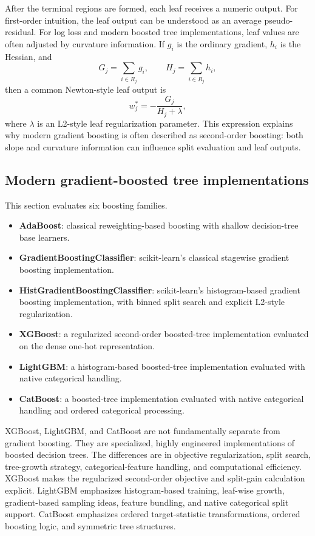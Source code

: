 After the terminal regions are formed, each leaf receives a numeric output. For first-order intuition, the leaf output can be understood as an average pseudo-residual. For log loss and modern boosted tree implementations, leaf values are often adjusted by curvature information. If \(g_i\) is the ordinary gradient, \(h_i\) is the Hessian, and
\[
G_j=\sum_{i\in R_j}g_i,
\qquad
H_j=\sum_{i\in R_j}h_i,
\]
then a common Newton-style leaf output is
\[
w_j^*
=
-
\frac{G_j}{H_j+\lambda},
\]
where \(\lambda\) is an L2-style leaf regularization parameter. This expression explains why modern gradient boosting is often described as second-order boosting: both slope and curvature information can influence split evaluation and leaf outputs.

\subsection{Modern gradient-boosted tree implementations}

This section evaluates six boosting families.

\begin{itemize}[leftmargin=*]
    \item \textbf{AdaBoost}: classical reweighting-based boosting with shallow decision-tree base learners.
    \item \textbf{GradientBoostingClassifier}: scikit-learn's classical stagewise gradient boosting implementation.
    \item \textbf{HistGradientBoostingClassifier}: scikit-learn's histogram-based gradient boosting implementation, with binned split search and explicit L2-style regularization.
    \item \textbf{XGBoost}: a regularized second-order boosted-tree implementation evaluated on the dense one-hot representation.
    \item \textbf{LightGBM}: a histogram-based boosted-tree implementation evaluated with native categorical handling.
    \item \textbf{CatBoost}: a boosted-tree implementation evaluated with native categorical handling and ordered categorical processing.
\end{itemize}

XGBoost, LightGBM, and CatBoost are not fundamentally separate from gradient boosting. They are specialized, highly engineered implementations of boosted decision trees. The differences are in objective regularization, split search, tree-growth strategy, categorical-feature handling, and computational efficiency. XGBoost makes the regularized second-order objective and split-gain calculation explicit. LightGBM emphasizes histogram-based training, leaf-wise growth, gradient-based sampling ideas, feature bundling, and native categorical split support. CatBoost emphasizes ordered target-statistic transformations, ordered boosting logic, and symmetric tree structures.

